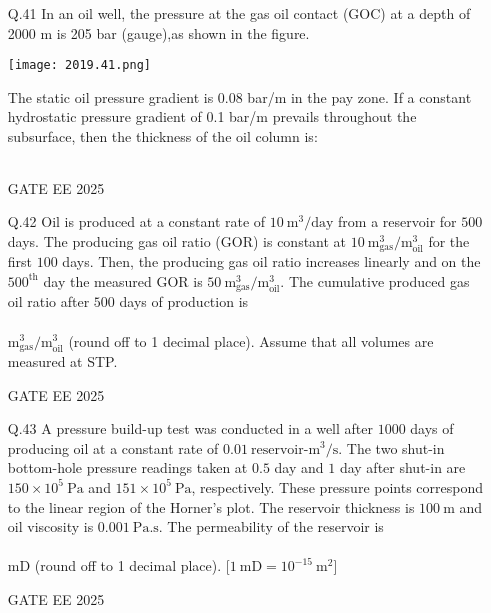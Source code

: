 \documentclass{article}
\begin{document}
\begin{enumerate}[leftmargin=*,series=q]
\setcounter{enumi}{40}

\item[Q.41] In an oil well, the pressure at the gas oil contact (GOC) at a depth of 2000 m is 205 bar (gauge),as shown in the figure.

\texttt{[image: 2019.41.png]}

The static oil pressure gradient is 0.08 bar/m in the pay zone. If a constant hydrostatic pressure gradient of 0.1 bar/m prevails throughout the subsurface, then the thickness of the oil column is:

\begin{tabular}{llll}
\end{tabular}
GATE EE 2025
\vspace{0.5cm}
\item[Q.42] Oil is produced at a constant rate of $10 \ \text{m}^3/\text{day}$ from a reservoir for $500$ days.  
The producing gas oil ratio (GOR) is constant at $10 \ \text{m}^3_{\text{gas}}/\text{m}^3_{\text{oil}}$ for the first $100$ days.  
Then, the producing gas oil ratio increases linearly and on the $500^{\text{th}}$ day the measured GOR is $50 \ \text{m}^3_{\text{gas}}/\text{m}^3_{\text{oil}}$.  
The cumulative produced gas oil ratio after $500$ days of production is \\\\ $\text{m}^3_{\text{gas}}/\text{m}^3_{\text{oil}}$ (round off to 1 decimal place).  
Assume that all volumes are measured at STP.  

GATE EE 2025

\vspace{0.5cm}
\item[Q.43] A pressure build-up test was conducted in a well after $1000$ days of producing oil at a constant rate of $0.01 \ \text{reservoir-m}^3/\text{s}$.  
The two shut-in bottom-hole pressure readings taken at $0.5$ day and $1$ day after shut-in are $150 \times 10^5 \ \text{Pa}$ and $151 \times 10^5 \ \text{Pa}$, respectively.  
These pressure points correspond to the linear region of the Horner's plot.  
The reservoir thickness is $100 \ \text{m}$ and oil viscosity is $0.001 \ \text{Pa.s}$.  
The permeability of the reservoir is \\\\ mD (round off to 1 decimal place).  
[$1 \ \text{mD} = 10^{-15} \ \text{m}^2$]  


GATE EE 2025


\end{enumerate}
\end{document}
